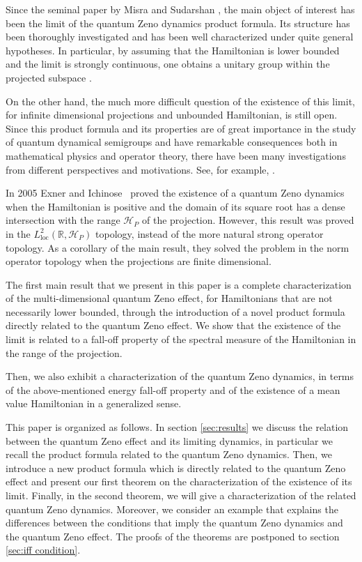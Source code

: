 \documentclass[aip,jmp
]{revtex4}
\newcommand{\RM}{\mathbb{R}}
\theoremstyle{definition}
\begin{document}
Since the seminal paper by Misra and Sudarshan \cite{misra}, the
main object of interest has been the limit of the
quantum Zeno dynamics product formula.
Its structure has been thoroughly investigated and has been well characterized under quite general
hypotheses. In particular, by assuming that  the Hamiltonian is lower bounded and the limit is strongly continuous, one obtains  a unitary group within the projected subspace \cite{misra,Exnerbook}.

On the other hand, the much more difficult question
of the existence of this limit, for infinite dimensional projections and unbounded Hamiltonian,
is still open.
Since this product formula and its properties are of great
importance in the  study of quantum dynamical semigroups and
have remarkable consequences both in mathematical
physics and operator theory, there have been many investigations
from different perspectives and motivations. See, for example, \cite{Friedman72,Friedman1,gustafsonmisra,Schmidt02,Schmidt03,Matolcsi03,EINZ}.


 In 2005 Exner and Ichinose~\cite{exner} proved the existence of a quantum Zeno dynamics when the Hamiltonian is positive and the domain of its square root has a dense intersection with the range $\mathcal{H}_P$ of the projection. However, this result was proved in the $L^2_{\textrm{loc}}(\RM,\mathcal{H}_P)$ topology, instead of the more natural strong operator topology.
As a corollary of the main result, they
solved the problem in the norm operator topology when the projections are finite dimensional.

The first main result that we present in this paper is a complete characterization
of the multi-dimensional quantum Zeno effect, for Hamiltonians that are not
necessarily lower bounded, through the introduction of a novel
product formula directly related to the quantum Zeno effect.
 We show that the existence of the limit is related to
a fall-off property of the spectral measure of the Hamiltonian in
the range of the projection.

Then, we also exhibit a characterization of the quantum Zeno dynamics, in terms of the above-mentioned energy fall-off property and of the existence of a mean value Hamiltonian in a generalized sense.

This paper is organized as follows. In section \ref{sec:results} we discuss the relation
between the quantum Zeno effect and its limiting dynamics, in particular
we recall the product formula related to the quantum Zeno dynamics.
Then, we introduce a new product formula which is
directly related to the quantum Zeno effect and present our first theorem on the
characterization of the existence of its limit.
Finally, in the second theorem, we will give  a characterization of the related quantum Zeno dynamics.
Moreover,  we consider  an
example that explains  the differences between the
conditions that imply the quantum Zeno dynamics and the quantum Zeno effect.
The proofs of the theorems are postponed to section \ref{sec:iff condition}.
\end{document}
